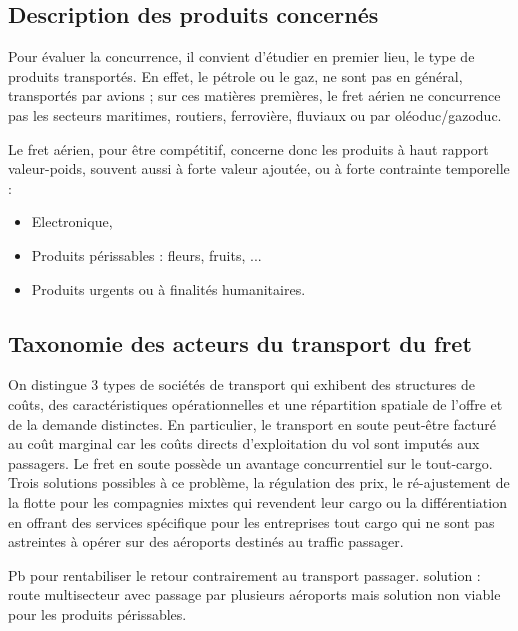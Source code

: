 \subsection{Description des produits concernés}
Pour évaluer la concurrence, il convient d'étudier en premier lieu, le type de produits transportés. En effet, le pétrole ou le gaz, ne sont pas en général, transportés par avions ; sur ces matières premières, le fret aérien ne concurrence pas les secteurs maritimes, routiers, ferrovière, fluviaux ou par oléoduc/gazoduc. 

Le fret aérien, pour être compétitif, concerne donc les produits à haut rapport valeur-poids, souvent aussi à forte valeur ajoutée, ou à forte contrainte temporelle :


\begin{itemize}
	\item Electronique,
	\item Produits périssables : fleurs, fruits, ...
	\item Produits urgents ou à finalités humanitaires.
\end{itemize}









\subsection{Taxonomie des acteurs du transport du fret}

On distingue 3 types de sociétés de transport qui exhibent des structures de coûts, des caractéristiques opérationnelles et une répartition spatiale de l'offre et de la demande distinctes. En particulier, le transport en soute peut-être facturé au coût marginal car les coûts directs d'exploitation du vol sont imputés aux passagers. Le fret en soute possède un avantage concurrentiel sur le tout-cargo. Trois solutions possibles à ce problème, la régulation des prix, le ré-ajustement de la flotte pour les compagnies mixtes qui revendent leur cargo ou la différentiation en offrant des services spécifique pour les entreprises tout cargo qui ne sont pas astreintes à opérer sur des aéroports destinés au traffic passager. 

Pb pour rentabiliser le retour contrairement au transport passager.
solution : route multisecteur avec passage par plusieurs aéroports
mais solution non viable pour les produits périssables.


